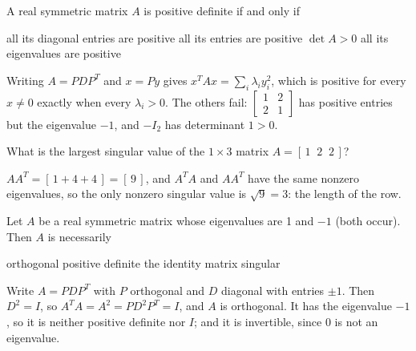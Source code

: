 \begin{question}[id=sym-18]
A real symmetric matrix $A$ is positive definite if and only if
\begin{options}
  \option all its diagonal entries are positive
  \option all its entries are positive
  \option $\det A > 0$
  \correct all its eigenvalues are positive
\end{options}
\begin{solution}
Writing $A = PDP^T$ and $x = Py$ gives $x^TAx = \sum_i \lambda_i y_i^2$, which is positive for every $x \ne 0$ exactly when every $\lambda_i > 0$. The others fail: $\begin{bmatrix} 1 & 2 \\ 2 & 1 \end{bmatrix}$ has positive entries but the eigenvalue $-1$, and $-I_2$ has determinant $1 > 0$.
\end{solution}
\end{question}

\begin{question}[id=sym-19]
What is the largest singular value of the $1 \times 3$ matrix $A = [\,1 \;\; 2 \;\; 2\,]$?
\begin{solution}
$AA^T = [\,1 + 4 + 4\,] = [\,9\,]$, and $A^TA$ and $AA^T$ have the same nonzero eigenvalues, so the only nonzero singular value is $\sqrt{9} = 3$: the length of the row.
\end{solution}
\end{question}

\begin{question}[id=sym-20, marks=2]
Let $A$ be a real symmetric matrix whose eigenvalues are 1 and $-1$ (both occur). Then $A$ is necessarily
\begin{options}
  \correct orthogonal
  \option positive definite
  \option the identity matrix
  \option singular
\end{options}
\begin{solution}
Write $A = PDP^T$ with $P$ orthogonal and $D$ diagonal with entries $\pm 1$. Then $D^2 = I$, so $A^TA = A^2 = PD^2P^T = I$, and $A$ is orthogonal. It has the eigenvalue $-1$, so it is neither positive definite nor $I$; and it is invertible, since 0 is not an eigenvalue.
\end{solution}
\end{question}


